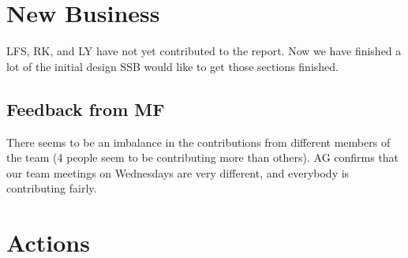 \documentclass[a4paper,11pt,twoside,class=meetingmins,crop=false]{standalone}
\begin{document}
\section{New Business}
\begin{items}
    \item LFS, RK, and LY have not yet contributed to the report. Now we have finished a lot of the initial design SSB would like to get those sections finished.
    \subsection{Feedback from MF}
        \item There seems to be an imbalance in the contributions from different members of the team (4 people seem to be contributing more than others). AG confirms that our team meetings on Wednesdays are very different, and everybody is contributing fairly.
\end{items}

\vspace{1em}
\vspace{1em}

\section{Actions}
\begin{items}
\end{items}
\end{document}
